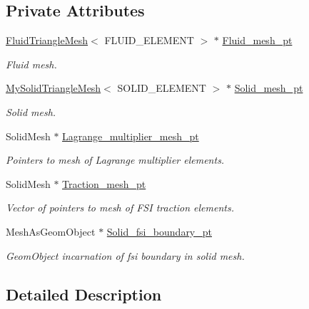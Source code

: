 \subsection*{Private Attributes}
\begin{DoxyCompactItemize}
\item 
\hyperlink{classFluidTriangleMesh}{Fluid\+Triangle\+Mesh}$<$ F\+L\+U\+I\+D\+\_\+\+E\+L\+E\+M\+E\+NT $>$ $\ast$ \hyperlink{classUnstructuredFSIProblem_a33c3b4cd9923f8b25368ff20e4810b2c}{Fluid\+\_\+mesh\+\_\+pt}
\begin{DoxyCompactList}\small\item\em Fluid mesh. \end{DoxyCompactList}\item 
\hyperlink{classMySolidTriangleMesh}{My\+Solid\+Triangle\+Mesh}$<$ S\+O\+L\+I\+D\+\_\+\+E\+L\+E\+M\+E\+NT $>$ $\ast$ \hyperlink{classUnstructuredFSIProblem_aeb164665366e237ca311e448466d7c9d}{Solid\+\_\+mesh\+\_\+pt}
\begin{DoxyCompactList}\small\item\em Solid mesh. \end{DoxyCompactList}\item 
Solid\+Mesh $\ast$ \hyperlink{classUnstructuredFSIProblem_ab30c2bc8de791e91d0bba19b048b5219}{Lagrange\+\_\+multiplier\+\_\+mesh\+\_\+pt}
\begin{DoxyCompactList}\small\item\em Pointers to mesh of Lagrange multiplier elements. \end{DoxyCompactList}\item 
Solid\+Mesh $\ast$ \hyperlink{classUnstructuredFSIProblem_ab7ada68f864e990b7b5e40000c289aa1}{Traction\+\_\+mesh\+\_\+pt}
\begin{DoxyCompactList}\small\item\em Vector of pointers to mesh of F\+SI traction elements. \end{DoxyCompactList}\item 
Mesh\+As\+Geom\+Object $\ast$ \hyperlink{classUnstructuredFSIProblem_aa7471e8fb88098faa147e1162480feff}{Solid\+\_\+fsi\+\_\+boundary\+\_\+pt}
\begin{DoxyCompactList}\small\item\em Geom\+Object incarnation of fsi boundary in solid mesh. \end{DoxyCompactList}\end{DoxyCompactItemize}


\subsection{Detailed Description}
